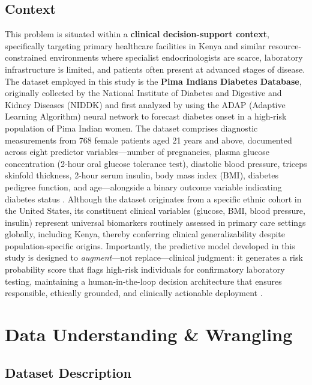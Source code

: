 \documentclass[12pt]{article}
\begin{document}
\subsection{Context}
This problem is situated within a \textbf{clinical decision-support context}, specifically targeting primary healthcare facilities in Kenya and similar resource-constrained environments where specialist endocrinologists are scarce, laboratory infrastructure is limited, and patients often present at advanced stages of disease. The dataset employed in this study is the \textbf{Pima Indians Diabetes Database}, originally collected by the National Institute of Diabetes and Digestive and Kidney Diseases (NIDDK) and first analyzed by \citet{Smith1988} using the ADAP (Adaptive Learning Algorithm) neural network to forecast diabetes onset in a high-risk population of Pima Indian women. The dataset comprises diagnostic measurements from 768 female patients aged 21 years and above, documented across eight predictor variables—number of pregnancies, plasma glucose concentration (2-hour oral glucose tolerance test), diastolic blood pressure, triceps skinfold thickness, 2-hour serum insulin, body mass index (BMI), diabetes pedigree function, and age—alongside a binary outcome variable indicating diabetes status \citep{Smith1988}. Although the dataset originates from a specific ethnic cohort in the United States, its constituent clinical variables (glucose, BMI, blood pressure, insulin) represent universal biomarkers routinely assessed in primary care settings globally, including Kenya, thereby conferring clinical generalizability despite population-specific origins. Importantly, the predictive model developed in this study is designed to \textit{augment}—not replace—clinical judgment: it generates a risk probability score that flags high-risk individuals for confirmatory laboratory testing, maintaining a human-in-the-loop decision architecture that ensures responsible, ethically grounded, and clinically actionable deployment \citep{ADA2023Standards}.

\section{Data Understanding \& Wrangling}

\subsection{Dataset Description}
\end{document}
